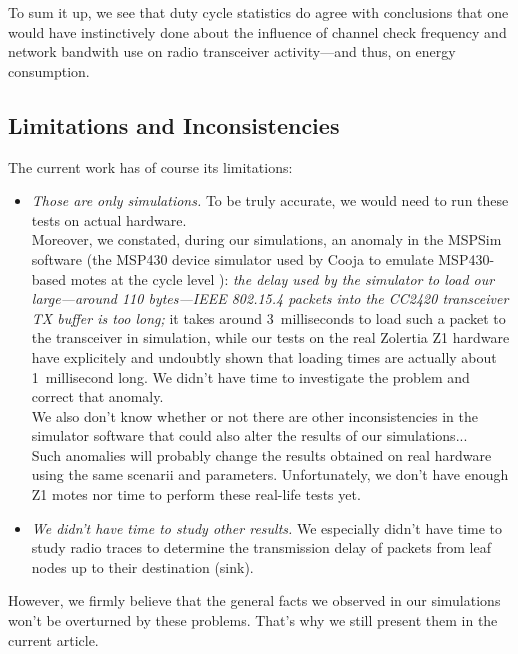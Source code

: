 \documentclass[a4paper,twoside]{article}
\begin{document}
To sum it up, we see that duty cycle statistics do agree with conclusions
that one would have instinctively done about the influence of channel check
frequency and network bandwith use on radio transceiver activity---and thus,
on energy consumption.


\subsection{Limitations and Inconsistencies}
\label{SectLimits}

The current work has of course its limitations:

\begin{itemize}

\item \emph{Those are only simulations.} To be truly accurate, we would need
to run these tests on actual hardware.\\
Moreover, we constated, during our simulations, an anomaly in the MSPSim
software (the MSP430 device simulator used by Cooja to emulate MSP430-based
motes at the cycle level \cite{MSPSim}): \emph{the delay used by the
simulator to load our large---around 110 bytes---IEEE 802.15.4 packets into
the CC2420 transceiver TX buffer is too long;} it takes around 3~milliseconds
to load such a packet to the transceiver in simulation, while our tests
on the real Zolertia Z1 hardware have explicitely and undoubtly shown that
loading times are actually about 1~millisecond long. We didn't have time
to investigate the problem and correct that anomaly.\\
We also don't know whether or not there are other inconsistencies in
the simulator software that could also alter the results of our
simulations...\\
Such anomalies will probably change the results obtained on real
hardware using the same scenarii and parameters. Unfortunately, we don't
have enough Z1 motes nor time to perform these real-life tests yet.

\item \emph{We didn't have time to study other results.} We especially
didn't have time to study radio traces to determine the transmission
delay of packets from leaf nodes up to their destination (sink).

\end{itemize}

However, we firmly believe that the general facts we observed in our
simulations won't be overturned by these problems. That's why we still
present them in the current article.
\end{document}
